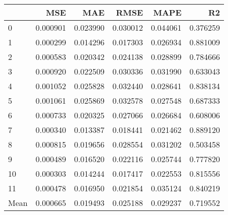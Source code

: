 \begin{tabular}{lrrrrr}
\toprule
 & MSE & MAE & RMSE & MAPE & R2 \\
\midrule
0 & 0.000901 & 0.023990 & 0.030012 & 0.044061 & 0.376259 \\
1 & 0.000299 & 0.014296 & 0.017303 & 0.026934 & 0.881009 \\
2 & 0.000583 & 0.020342 & 0.024138 & 0.028899 & 0.784666 \\
3 & 0.000920 & 0.022509 & 0.030336 & 0.031990 & 0.633043 \\
4 & 0.001052 & 0.025828 & 0.032440 & 0.028641 & 0.838134 \\
5 & 0.001061 & 0.025869 & 0.032578 & 0.027548 & 0.687333 \\
6 & 0.000733 & 0.020325 & 0.027066 & 0.026684 & 0.608006 \\
7 & 0.000340 & 0.013387 & 0.018441 & 0.021462 & 0.889120 \\
8 & 0.000815 & 0.019656 & 0.028554 & 0.031202 & 0.503458 \\
9 & 0.000489 & 0.016520 & 0.022116 & 0.025744 & 0.777820 \\
10 & 0.000303 & 0.014244 & 0.017417 & 0.022553 & 0.815556 \\
11 & 0.000478 & 0.016950 & 0.021854 & 0.035124 & 0.840219 \\
Mean & 0.000665 & 0.019493 & 0.025188 & 0.029237 & 0.719552 \\
\bottomrule
\end{tabular}
